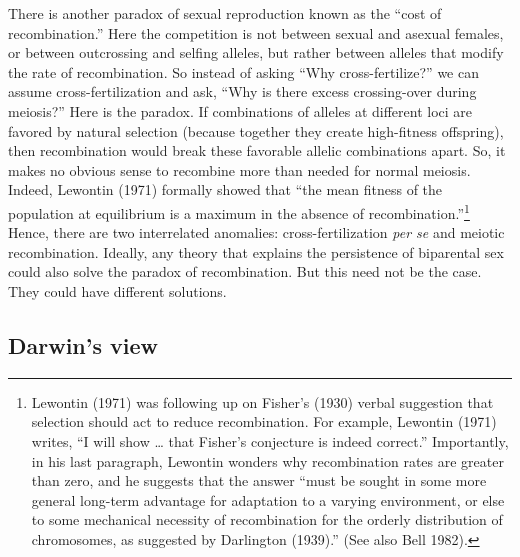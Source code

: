 \documentclass[
  letterpaper,
]{book}
\begin{document}
There is another paradox of sexual reproduction known as the ``cost of
recombination.'' Here the competition is not between sexual and asexual
females, or between outcrossing and selfing alleles, but rather between
alleles that modify the rate of recombination. So instead of asking
``Why cross-fertilize?'' we can assume cross-fertilization and ask,
``Why is there excess crossing-over during meiosis?'' Here is the
paradox. If combinations of alleles at different loci are favored by
natural selection (because together they create high-fitness offspring),
then recombination would break these favorable allelic combinations
apart. So, it makes no obvious sense to recombine more than needed for
normal meiosis. Indeed, Lewontin (1971) formally showed that ``the mean
fitness of the population at equilibrium is a maximum in the absence of
recombination.''\footnote{Lewontin (1971) was following up on Fisher's
  (1930) verbal suggestion that selection should act to reduce
  recombination. For example, Lewontin (1971) writes, ``I will show
  \ldots{} that Fisher's conjecture is indeed correct.'' Importantly, in
  his last paragraph, Lewontin wonders why recombination rates are
  greater than zero, and he suggests that the answer ``must be sought in
  some more general long-term advantage for adaptation to a varying
  environment, or else to some mechanical necessity of recombination for
  the orderly distribution of chromosomes, as suggested by Darlington
  (1939).'' (See also Bell 1982).} Hence, there are two interrelated
anomalies: cross-fertilization \emph{per se} and meiotic recombination.
Ideally, any theory that explains the persistence of biparental sex
could also solve the paradox of recombination. But this need not be the
case. They could have different solutions.

\subsection{Darwin's view}\label{darwins-view}
\end{document}
